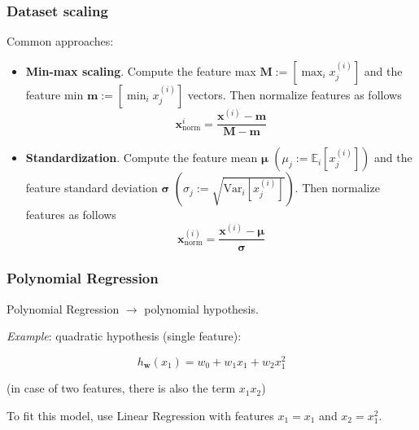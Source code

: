 \documentclass{beamer}
\begin{document}
	\begin{frame}
		\frametitle{Dataset scaling}
	
		Common approaches:
		\begin{itemize}
			\item \textbf{Min-max scaling}. Compute the feature max $\bm{M} := [\max_i x^{(i)}_j]$ and the feature min $\bm{m} := [\min_i x^{(i)}_j]$ vectors. Then normalize features as follows
			\begin{equation*}
				\bm{x}_{\text{norm}}^i = \frac{\bm{x}^{(i)} - \bm{m}}{\bm{M} - \bm{m}}
			\end{equation*} 
			\item \textbf{Standardization}. Compute the feature mean $\bm{\mu}$ $(\mu_j := \mathbb{E}_i[x^{(i)}_j])$ and the feature standard deviation $\bm{\sigma}$ $(\sigma_j := \sqrt{\text{Var}_i[x^{(i)}_j]})$. Then normalize features as follows
			\begin{equation*}
				\bm{x}_{\text{norm}}^{(i)} = \frac{\bm{x}^{(i)} -\bm{\mu}}{\bm{\sigma}} 
			\end{equation*}
		\end{itemize}
		
	\end{frame}



	\begin{frame}
		\frametitle{Polynomial Regression}
		Polynomial Regression $\rightarrow$ polynomial hypothesis.
		
		\vspace{5mm}
		
		\textit{Example}: quadratic hypothesis (single feature):	
		
		$$h_{\bm{w}}(x_1) = w_0 + w_1 x_1 + w_2 x_1^2$$
		
		(in case of two features, there is also the term $x_1 x_2$)
		
		\vspace{5mm}
		
		To fit this model, use Linear Regression with features $x_1 = x_1$ and $x_2 = x_1^2$.
	\end{frame}
\end{document}
